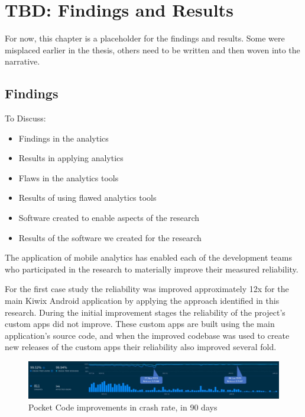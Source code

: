 \chapter{TBD: Findings and Results}
For now, this chapter is a placeholder for the findings and results. Some were misplaced earlier in the thesis, others need to be written and then woven into the narrative.

\section{Findings}
\label{findings-section}

To Discuss:
\begin{itemize}
    \item Findings in the analytics
    \item Results in applying analytics
    \item Flaws in the analytics tools
    \item Results of using flawed analytics tools
    \item Software created to enable aspects of the research
    \item Results of the software we created for the research
\end{itemize}

The application of mobile analytics has enabled each of the development teams who participated in the research to materially improve their measured reliability. 

For the first case study the reliability was improved approximately 12x for the main Kiwix Android application by applying the approach identified in this research. 
During the initial improvement stages the reliability of the project's custom apps did not improve. These custom apps are built using the main application's source code, and when the improved codebase was used to create new releases of the custom apps their reliability also improved several fold.

\begin{figure}[htbp!]
    \centering
    \includegraphics[width=\textwidth]{images/annotated_pocketcode_90_day_fabric_crashlytics_report.jpg}
    \caption{Pocket Code improvements in crash rate, in 90 days}
    \label{fig:pocketcode_improvements_in_crash_rate}
\end{figure}

